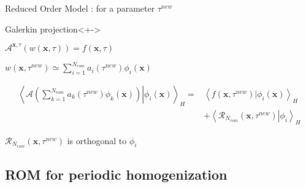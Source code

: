 \begin{frame}{Reduced Order Model : for a parameter $\tau^{new}$}
\begin{block}{Galerkin projection}<+->
%
\begin{description}
\item<+-> [For a given problem] $\mathcal{A}^{\mathbf{x},\tau}\left(w(\mathbf{x},\tau)\right)=f(\mathbf{x},\tau)$
\item<+-> [ROM] $w(\mathbf{x},\tau^{new})\simeq\sum\limits_{i=1}^{N_{rom}} a_i(\tau^{new})\phi_i(\mathbf{x})$
\item<+-> [The problem in $a_k(\tau^{new})$ : projection on $\phi_i$] %
\[%
\begin{split}
\left\langle\left.\mathcal{A}\left(\sum\limits_{k=1}^{N_{rom}} a_k(\tau^{new})\phi_k(\mathbf{x})\right) \right|\phi_i\left(\mathbf{x}\right)\right\rangle_H =& %
\left\langle f \left(\mathbf{x},\tau^{new}\right)|\phi_i(\mathbf{x})\right\rangle_H\\%
%
&+\left\langle\left.\mathcal{R}_{N_{rom}}(\mathbf{x},\tau^{new})\right|\phi_i\right\rangle_H
\end{split}
\]
\item<+-> [Remainder term] $\mathcal{R}_{N_{rom}}(\mathbf{x},\tau^{new})$ is orthogonal to $\phi_i$
\end{description}
%
\end{block}
%
\end{frame}

\subsection{ROM for periodic homogenization}

